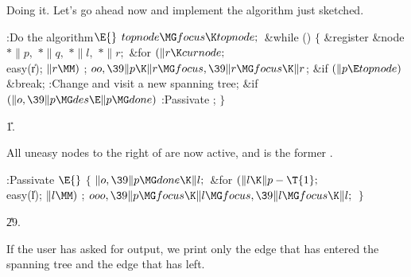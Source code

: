 Doing it. Let's go ahead now and implement the algorithm
just sketched.

\Y\B\4:Do the algorithm\X${}\E{}$\6
$\\{topnode}\MG\\{focus}\K\\{topnode};{}$\6
\&{while} ()\5
${}\{{}$\1\6
\&{register} \&{node} ${}{*}\|p,{}$ ${}{*}\|q,{}$ ${}{*}\|l,{}$ ${}{*}\|r;{}$\7
\&{for} ${}(\|r\K\\{curnode};{}$ \\{easy}(\|r); ${}\|r\MM){}$\1\5
;\2\6
${}\\{oo},\39\|p\K\|r\MG\\{focus},\39\|r\MG\\{focus}\K\|r{}$;\6
\&{if} ${}(\|p\E\\{topnode}){}$\1\5
\&{break};\2\6
:Change  and visit a new spanning tree\X;\6
\&{if} ${}(\|o,\39\|p\MG\\{des}\E\|p\MG\\{done}){}$\1\5
:Passivate \X;\2\6
\4${}\}{}$\2\par
\U1.\fi

All uneasy nodes to the right of  are now active,
and  is the
former .

\Y\B\4:Passivate \X${}\E{}$\6
${}\{{}$\1\6
${}\|o,\39\|p\MG\\{done}\K\|l;{}$\6
\&{for} ${}(\|l\K\|p-\T{1};{}$ \\{easy}(\|l); ${}\|l\MM){}$\1\5
;\2\6
${}\\{ooo},\39\|p\MG\\{focus}\K\|l\MG\\{focus},\39\|l\MG\\{focus}\K\|l;{}$\6
\4${}\}{}$\2\par
\U29.\fi

If the user has asked for  output, we print
only the
edge that has entered the spanning tree and the edge that has left.

